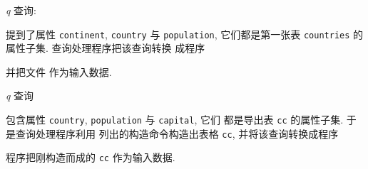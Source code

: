 \textit{q} 查询:
提到了属性 \texttt{continent}, \texttt{country} 与 \texttt{population},
它们都是第一张表 \texttt{countries} 的属性子集. 查询处理程序把该查询转换
成程序 
并把文件  作为输入数据.

\textit{q} 查询 
包含属性 \texttt{country}, \texttt{population} 与 \texttt{capital}, 它们 
都是导出表 \texttt{cc} 的属性子集. 于是查询处理程序利用 
列出的构造命令构造出表格 \texttt{cc}, 并将该查询转换成程序
程序把刚构造而成的 \texttt{cc} 作为输入数据.
